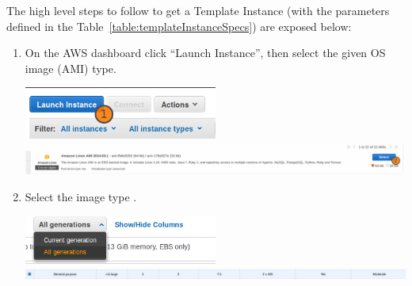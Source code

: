 \documentclass[journal abbreviation, manuscript]{copernicus}
\begin{document}
The high level steps to follow to get a Template Instance (with the parameters defined in the Table~\ref{table:templateInstanceSpecs}) are exposed below:
\begin{enumerate}

\item On the AWS dashboard click ``Launch Instance'', then select the given OS image (AMI) type.
  \begin{center}
  \includegraphics[width=2.5in]{images/screenshots/instance_creation/01.png}\\
  \includegraphics[width=6.5in]{images/screenshots/instance_creation/02.png}
  \end{center}


\item Select the image type .
  \begin{center}
  \includegraphics[width=2.5in]{images/screenshots/instance_creation/03.png}\\
  \includegraphics[width=6.5in]{images/screenshots/instance_creation/04.png}
\end{center}


\end{enumerate}
\end{document}
